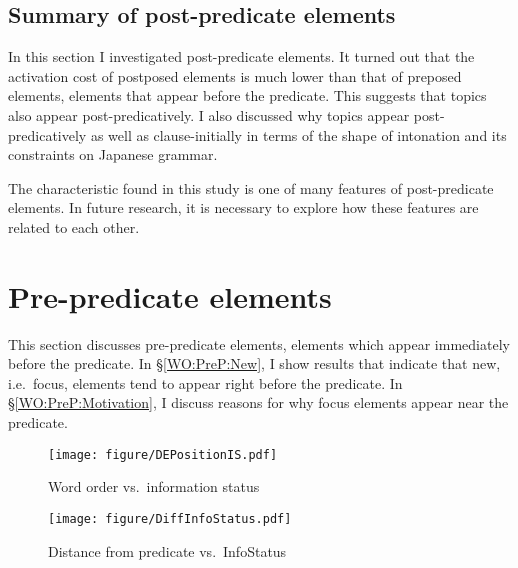 \subsection{Summary of post-predicate elements}

In this section
I investigated post-predicate elements.
It turned out that
the activation cost of postposed elements is much lower than
that of preposed elements,
elements that appear before the predicate.
This suggests that topics also appear post-predicatively.
I also discussed why
topics appear post-predicatively as well as clause-initially
in terms of the shape of intonation and its constraints on Japanese grammar.

The characteristic found in this study is one of many features of post-predicate elements.
In future research,
it is necessary to explore how these features are related to each other.


\section{Pre-predicate elements}\label{WOPrePredEles}

This section discusses pre-predicate elements,
elements which appear immediately before the predicate.
In \S \ref{WO:PreP:New},
I show results that indicate that
new, i.e.\ focus, elements tend to appear right before the predicate.
In \S \ref{WO:PreP:Motivation},
I discuss reasons for why focus elements appear near the predicate.

\begin{figure}
	\begin{center}
	\texttt{[image: figure/DEPositionIS.pdf]}
	\caption{Word order vs.\ information status}
	\label{DEPositionISF2}
	\end{center}
\end{figure}
\begin{figure}
	\begin{center}
	\texttt{[image: figure/DiffInfoStatus.pdf]}
	\caption{Distance from predicate vs.\ InfoStatus}
	\label{DiffInfoStatusF2}
	\end{center}
\end{figure}


